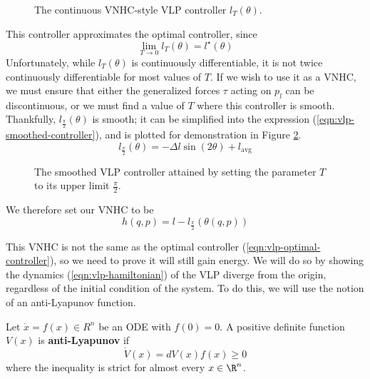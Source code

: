 \begin{figure}
   \centering
   
   \caption{The continuous VNHC-style VLP controller \(l_T(\theta)\).}\label{fig:vlp-T-controller}
\end{figure}

This controller approximates the optimal controller, since 
\[
   \lim\limits_{T \rightarrow 0} l_T(\theta) = l^\star(\theta)
\]
Unfortunately, while \(l_T(\theta)\) is continuously differentiable, it is not
twice continuously differentiable for most values of \(T\).
If we wish to use it as a VNHC, we must ensure that either the generalized
forces \(\tau\) acting on \(p_l\) can be discontinuous, or we must find a value
of \(T\) where this controller is smooth.
Thankfully, \(l_{\frac{\pi}{2}}(\theta)\) is smooth; it can be simplified into
the expression (\ref{eqn:vlp-smoothed-controller}), and is plotted for
demonstration in Figure \ref{fig:vlp-smoothed-controller}.
\begin{equation}\label{eqn:vlp-smoothed-controller}
   l_\frac{\pi}{2}(\theta) = -\Delta l \sin(2\theta) + l_{\text{avg}}
\end{equation}

\begin{figure}
   \centering
   \caption{The smoothed VLP controller attained by setting the parameter 
      \(T\) to its upper limit
   \(\frac{\pi}{2}\).}\label{fig:vlp-smoothed-controller}
\end{figure}

We therefore set our VNHC to be
\[
   h(q,p) = l - l_\frac{\pi}{2}\left(\theta(q,p)\right)
\]

This VNHC is not the same as the optimal controller
(\ref{eqn:vlp-optimal-controller}), so we need to prove it will still gain
energy. We will do so by showing the dynamics (\ref{eqn:vlp-hamiltonian}) of the
VLP diverge from the origin, regardless of the initial condition of the system. 
To do this, we will use the notion of an anti-Lyapunov function.

\begin{defn}\label{defn:anti-lyapunov}
   Let \(\dot{x} = f(x) \in R^n\) be an ODE with \(f(0) = 0\). 
   A positive definite function \(V(x)\) is \textbf{anti-Lyapunov} if 
   \[
      \dot{V}(x) = dV(x) f(x) \geq 0
   \]
   where the inequality is strict for almost every \(x \in \R^n\).
\end{defn}

